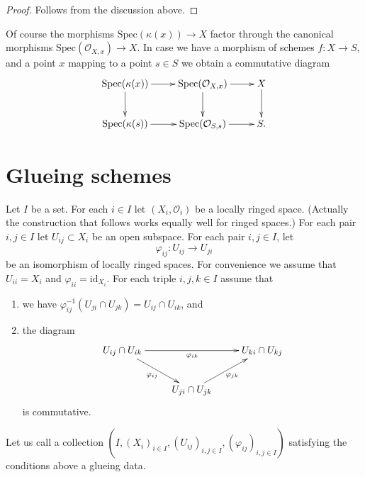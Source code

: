\begin{proof}
Follows from the discussion above.
\end{proof}

\noindent
Of course the morphisms $\text{Spec}(\kappa(x)) \to X$
factor through the canonical morphisms
$\text{Spec}(\mathcal{O}_{X, x}) \to X$.
In case we have a morphism of schemes $f : X \to S$,
and a point $x$ mapping to a point $s \in S$ we obtain
a commutative diagram
$$
\xymatrix{
\text{Spec}(\kappa(x)) \ar[r] \ar[d] &
\text{Spec}(\mathcal{O}_{X, x}) \ar[r] \ar[d] &
X \ar[d] \\
\text{Spec}(\kappa(s)) \ar[r] &
\text{Spec}(\mathcal{O}_{S, s}) \ar[r] &
S.
}
$$










\section{Glueing schemes}
\label{section-glueing-schemes}

\noindent
Let $I$ be a set.
For each $i \in I$ let $(X_i, \mathcal{O}_i)$ be 
a locally ringed space. (Actually the construction that
follows works equally well for ringed spaces.)
For each pair $i, j \in I$ let $U_{ij} \subset X_i$
be an open subspace.
For each pair $i, j \in I$, let
$$
\varphi_{ij} : U_{ij} \to U_{ji}
$$
be an isomorphism of locally ringed spaces.
For convenience we assume that $U_{ii} = X_i$ and
$\varphi_{ii} = \text{id}_{X_i}$.
For each triple $i, j, k \in I$ assume that
\begin{enumerate}
\item we have
$\varphi_{ij}^{-1}(U_{ji} \cap U_{jk}) =  U_{ij} \cap U_{ik}$, and
\item the diagram
$$
\xymatrix{
U_{ij} \cap U_{ik} \ar[rr]_{\varphi_{ik}} \ar[rd]_{\varphi_{ij}} & &
U_{ki} \cap U_{kj} \\
& U_{ji} \cap U_{jk} \ar[ru]_{\varphi_{jk}}
}
$$
is commutative.
\end{enumerate}
Let us call a collection
$(I, (X_i)_{i\in I}, (U_{ij})_{i,j\in I}, (\varphi_{ij})_{i,j\in I})$
satisfying the conditions above a glueing data.

